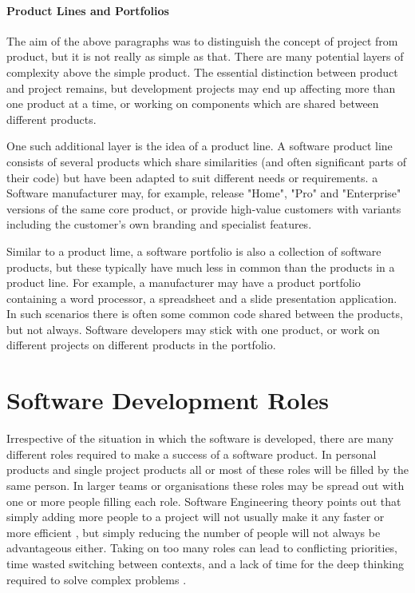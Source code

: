 \paragraph{Product Lines and Portfolios}

The aim of the above paragraphs was to distinguish the concept of project from product, but it is not really as simple as that. There are many potential layers of complexity above the simple product. The essential distinction between product and project remains, but development projects may end up affecting more than one product at a time, or working on components which are shared between different products.

One such additional layer is the idea of a product line. A software product line consists of several products which share similarities (and often significant parts of their code) but have been adapted to suit different needs or requirements. a Software manufacturer may, for example, release "Home", "Pro" and "Enterprise" versions of the same core product, or provide high-value customers with variants including the customer's own branding and specialist features.

Similar to a product lime, a software portfolio is also a collection of software products, but these typically have much less in common than the products in a product line. For example, a manufacturer may have a product portfolio containing a word processor, a spreadsheet and a slide presentation application. In such scenarios there is often some common code shared between the products, but not always. Software developers may stick with one product, or work on different projects on different products in the portfolio.

\section{Software Development Roles}
\label{section:software development roles}

Irrespective of the situation in which the software is developed, there are many different roles required to make a success of a software product. In personal products and single project products all or most of these roles will be filled by the same person. In larger teams or organisations these roles may be spread out with one or more people filling each role. Software Engineering theory points out that simply adding more people to a project will not usually make it any faster or more efficient \citep{Brooks1995}, but simply reducing the number of people will not always be advantageous either. Taking on too many roles can lead to conflicting priorities, time wasted switching between contexts, and a lack of time for the deep thinking  required to solve complex problems \citep{Newport2016}.


